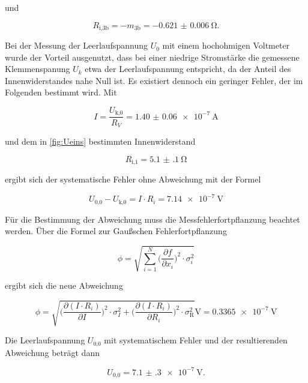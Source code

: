   und

  \begin{equation}
    R_\text{i,3b} = -m_\text{3b} = \SI{-0.621(6)}{\ohm}.
  \end{equation}

  Bei der Messung der Leerlaufspannung $U_0$ mit einem hochohmigen Voltmeter
  wurde der Vorteil ausgenutzt, dass bei einer niedrige Stromstärke die
  gemessene Klemmenspanung $U_k$ etwa der Leerlaufspannung entspricht, da
  der Anteil des Innenwiderstandes nahe Null ist.
  Es existiert dennoch ein geringer Fehler, der im Folgenden bestimmt wird.
  Mit

  \begin{equation}
    I = \frac{U_\text{k,0}}{R_V} = \SI{1.40(6)e-7}{\A}
  \end{equation}

  und dem in \ref{fig:Ueins} bestimmten Innenwiderstand

  \begin{equation}
    R_\text{i,1} = \SI{5.1(1)}{\ohm}
  \end{equation}

  ergibt sich der systematische Fehler ohne Abweichung mit der Formel

  \begin{equation}
    U_\text{0,0} - U_\text{k,0} = I \cdot R_i = \SI{7.14e-7}{\V}
  \end{equation}

  Für die Bestimmung der Abweichung muss die Messfehlerfortpflanzung
  beachtet werden. Über die Formel zur Gaußschen Fehlerfortpflanzung

  \begin{equation}
    \phi = \sqrt{\sum_{i=1}^{N} \biggl(\frac{\partial f}{\partial x_i}\biggr)^2
    \cdot \sigma_i^2}
  \end{equation}

  ergibt sich die neue Abweichung

  \begin{equation}
    \phi = \sqrt{\biggl(\frac{\partial(I \cdot R_i)}{\partial I}\biggr)^2
    \cdot \sigma_I^2
    + \biggl(\frac{\partial(I \cdot R_i)}{\partial R_i}\biggr)^2 \cdot
    \sigma_\text{R}^2} \si{\V}
    = \SI{0.3365e-7}{\V}
  \end{equation}

  Die Leerlaufspannung $U_\text{0,0}$ mit systematischem Fehler und der
  resultierenden Abweichung beträgt dann

  \begin{equation}
    U_\text{0,0} = \SI{7.1(3)e-7}{\V}.
  \end{equation}

